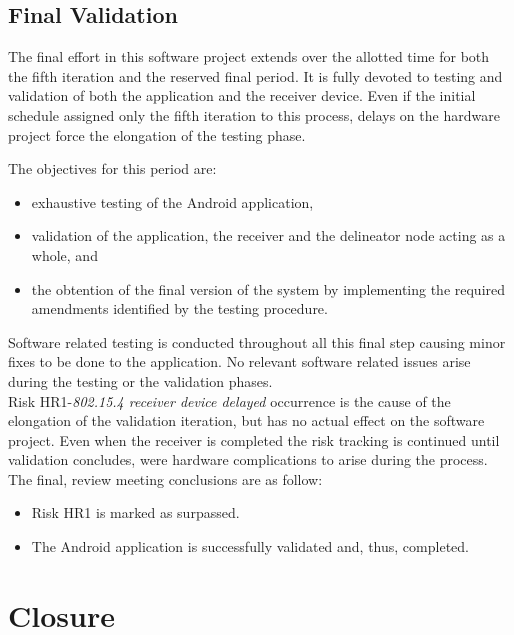 		\subsection{Final Validation}
			The final effort in this software project extends over the allotted time for both the fifth iteration and the reserved final period. It is fully devoted to testing and validation of both the application and the receiver device. Even if the initial schedule assigned only the fifth iteration to this process, delays on the hardware project  force the elongation of the testing phase.

			The objectives for this period are:
			\begin{itemize}
				\item exhaustive testing of the Android application,
				\item validation of the application, the receiver and the delineator node acting as a whole, and
				\item the obtention of the final version of the system by implementing the required amendments identified by the testing procedure.
			\end{itemize}

			Software related testing is conducted throughout all this final step causing minor fixes to be done to the application. No relevant software related issues arise during the testing or the validation phases.\\

			Risk HR1-\emph{802.15.4 receiver device delayed} occurrence is the cause of the elongation of the validation iteration, but has no actual effect on the software project. Even when the receiver is completed  the risk tracking is continued until validation concludes, were hardware complications to arise during the process.\\

			The final, review meeting conclusions are as follow:
			\begin{itemize}
				\item Risk HR1 is marked as surpassed.
				\item The Android application is successfully validated and, thus, completed.
			\end{itemize}
			
	\section{Closure}
	\label{sec:sw-ending}

